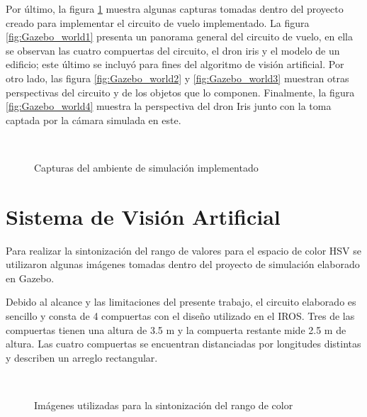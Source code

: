 Por último, la figura \ref{fig:Gazebo_worlds} muestra algunas capturas tomadas dentro del proyecto creado para implementar el circuito de vuelo implementado. La figura \ref{fig:Gazebo_world1} presenta un panorama general del circuito de vuelo, en ella se observan las cuatro compuertas del circuito, el dron iris y el modelo de un edificio; este último se incluyó para fines del algoritmo de visión artificial. Por otro lado, las figura \ref{fig:Gazebo_world2} y \ref{fig:Gazebo_world3}  muestran otras perspectivas del circuito y de los objetos que lo componen. Finalmente, la figura \ref{fig:Gazebo_world4} muestra la perspectiva del dron Iris junto con la toma captada por la cámara simulada en este.

\begin{figure}[ht]
    \centering
    \hfill
    \\
    \hfill
    \hfill

    \caption{Capturas del ambiente de simulación implementado}
    \label{fig:Gazebo_worlds}
\end{figure}


\section{Sistema de Visión Artificial}
Para realizar la sintonización del rango de valores para el espacio de color HSV se utilizaron algunas imágenes tomadas dentro del proyecto de simulación elaborado en Gazebo.

Debido al alcance y las limitaciones del presente trabajo, el circuito elaborado es sencillo y consta de 4 compuertas con el diseño utilizado en el IROS. Tres de las compuertas tienen una altura de 3.5 m y la compuerta restante mide 2.5 m de altura. Las cuatro compuertas se encuentran distanciadas por longitudes distintas y describen un arreglo rectangular.

\begin{figure}[ht]
    \centering
    \hfill
    \\
    \hfill
    \hfill

    \caption{Imágenes utilizadas para la sintonización del rango de color}
    \label{fig:cv_gates}
\end{figure}


